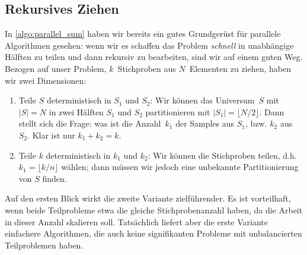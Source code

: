 \subsection{Rekursives Ziehen}
In \cref{algo:parallel_sum} haben wir bereits ein gutes Grundgerüst für parallele Algorithmen gesehen:
wenn wir es schaffen das Problem \emph{schnell} in unabhängige Hälften zu teilen und dann rekursiv zu bearbeiten, sind wir auf einem guten Weg.
Bezogen auf unser Problem, $k$~Stichproben aus $N$~Elementen zu ziehen, haben wir zwei Dimensionen:
\begin{enumerate}
    \item Teile $S$ deterministisch in $S_1$ und $S_2$: Wir können das Universum~$S$ mit $|S| = N$ in zwei Hälften $S_1$ und $S_2$ partitionieren mit $|S_1| = \lfloor N / 2 \rfloor$.
          Dann stellt sich die Frage: was ist die Anzahl~$k_1$ der Samples aus $S_1$, bzw. $k_2$ aus $S_2$. Klar ist nur $k_1 + k_2 = k$.

    \item Teile $k$ deterministisch in $k_1$ und $k_2$: Wir können die Stichproben teilen, d.h. $k_1 = \lfloor k/n \rfloor$ wählen; dann müssen wir jedoch eine unbekannte Partitionierung von $S$ finden.
\end{enumerate}

Auf den ersten Blick wirkt die zweite Variante zielführender.
Es ist vorteilhaft, wenn beide Teilprobleme etwa die gleiche Stichprobenanzahl haben, da die Arbeit in dieser Anzahl skalieren soll.
Tatsächlich liefert aber die erste Variante einfachere Algorithmen, die auch keine signifikanten Probleme mit unbalancierten Teilproblemen haben.

